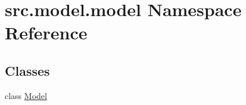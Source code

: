 \hypertarget{namespacesrc_1_1model_1_1model}{}\section{src.\+model.\+model Namespace Reference}
\label{namespacesrc_1_1model_1_1model}
\subsection*{Classes}
\begin{DoxyCompactItemize}
\item 
class \hyperlink{classsrc_1_1model_1_1model_1_1Model}{Model}
\end{DoxyCompactItemize}
